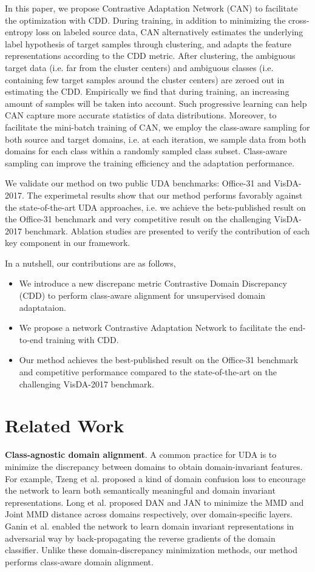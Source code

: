 \documentclass[conference]{IEEEtran}
\begin{document}
In this paper, we propose Contrastive Adaptation Network (CAN) to facilitate the optimization with CDD. During training, in addition to minimizing the cross-entropy loss on labeled source data, CAN alternatively estimates the underlying label hypothesis of target samples through clustering, and adapts the feature representations according to the CDD metric.
After clustering, the ambiguous target data (i.e. far from the cluster centers) and ambiguous classes (i.e. containing few target samples around the cluster centers) are zeroed out in estimating the CDD.
Empirically we find that during training, an increasing amount of samples will be taken into account. Such progressive learning can help CAN capture more accurate statistics of data distributions. 
Moreover, to facilitate the mini-batch training of CAN, we employ the class-aware sampling for both source and target domains, i.e. at each iteration, we sample data from both domains for each class within a randomly sampled class subset.
Class-aware sampling can improve the training efficiency and the adaptation performance.

We validate our method on two public UDA benchmarks: Office-31 and VisDA-2017. The experimetal results show that our method performs favorably against the state-of-the-art UDA approaches, i.e. we achieve the bets-published result on the Office-31 benchmark and very competitive result on the challenging VisDA-2017 benchmark.
Ablation studies are presented to verify the contribution of each key component in our framework. 

In a nutshell, our contributions are as follows, 
\begin{itemize}
    \item We introduce a new discrepanc metric Contrastive Domain Discrepancy (CDD) to perform class-aware alignment for unsupervised domain adaptataion.
    \item We propose a network Contrastive Adaptation Network to facilitate the end-to-end training with CDD.
    \item Our method achieves the best-published result on the Office-31 benchmark and competitive performance compared to the state-of-the-art on the challenging VisDA-2017 benchmark.
\end{itemize}

\section{Related Work}
\textbf{Class-agnostic domain alignment}. A common practice for UDA is to minimize the discrepancy between domains to obtain domain-invariant features.
For example, Tzeng et al. proposed a kind of domain confusion loss to encourage the network to learn both semantically meaningful and domain invariant representations.
Long et al. proposed DAN and JAN to minimize the MMD and Joint MMD distance across domains respectively, over domain-specific layers.
Ganin et al. enabled the network to learn domain invariant representations in adversarial way by back-propagating the reverse gradients of the domain classifier.
Unlike these domain-discrepancy minimization methods, our method performs class-aware domain alignment.
\end{document}
